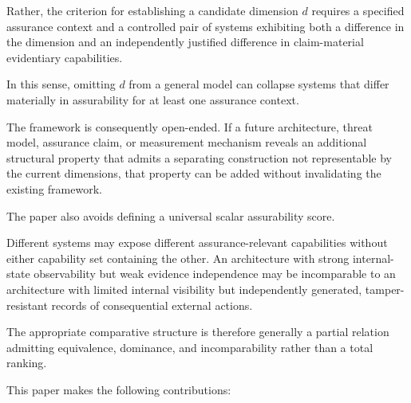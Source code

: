 Rather, the criterion for establishing a candidate dimension \(d\)
requires a specified assurance context and a controlled pair
of systems exhibiting both a difference in the dimension
and an independently justified difference in claim-material
evidentiary capabilities.

In this sense, omitting \(d\) from a general model can collapse systems that differ materially in assurability for at least one assurance context.

The framework is consequently open-ended.
If a future architecture, threat model, assurance claim, or measurement mechanism reveals an
additional structural property that admits a separating construction not representable by the current dimensions,
that property can be added without invalidating the existing framework.

The paper also avoids defining a universal scalar assurability score.

Different systems may expose different assurance-relevant capabilities without either capability set containing the other.
An architecture with strong internal-state observability but weak evidence independence may be incomparable
to an architecture with limited internal visibility but independently generated, tamper-resistant records of consequential external actions.

The appropriate comparative structure is therefore generally a partial relation admitting
equivalence, dominance, and incomparability rather than a total ranking.

This paper makes the following contributions:

